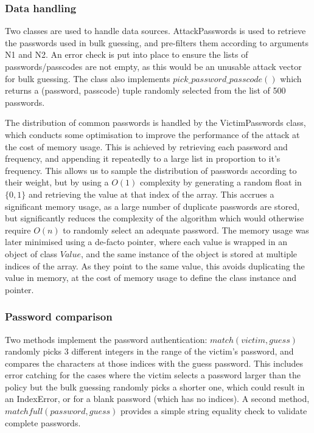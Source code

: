 \documentclass[british,11pt,a4paper]{article}
\begin{document}
\subsubsection{Data handling}
Two classes are used to handle data sources. AttackPasswords is used to retrieve the passwords used in bulk guessing, and pre-filters them according to arguments N1 and N2. An error check is put into place to ensure the lists of passwords/passcodes are not empty, as this would be an unusable attack vector for bulk guessing. The class also implements $pick\_password\_passcode()$ which returns a (password, passcode) tuple randomly selected from the list of 500 passwords.

The distribution of common passwords is handled by the VictimPasswords class, which conducts some optimisation to improve the performance of the attack at the cost of memory usage. This is achieved by retrieving each password and frequency, and appending it repeatedly to a large list in proportion to it's frequency. This allows us to sample the distribution of passwords according to their weight, but by using a $O(1)$ complexity by generating a random float in $\{0,1\}$ and retrieving the value at that index of the array. This accrues a significant memory usage, as a large number of duplicate passwords are stored, but significantly reduces the complexity of the algorithm which would otherwise require $O(n)$ to randomly select an adequate password. The memory usage was later minimised using a de-facto pointer, where each value is wrapped in an object of class $Value$, and the same instance of the object is stored at multiple indices of the array. As they point to the same value, this avoids duplicating the value in memory, at the cost of memory usage to define the class instance and pointer.

\subsubsection{Password comparison}
Two methods implement the password authentication: $match(victim, guess)$ randomly picks 3 different integers in the range of the victim's password, and compares the characters at those indices with the guess password. This includes error catching for the cases where the victim selects a password larger than the policy but the bulk guessing randomly picks a shorter one, which could result in an IndexError, or for a blank password (which has no indices). A second method, $matchfull(password, guess)$ provides a simple string equality check to validate complete passwords.
 
\end{document}
